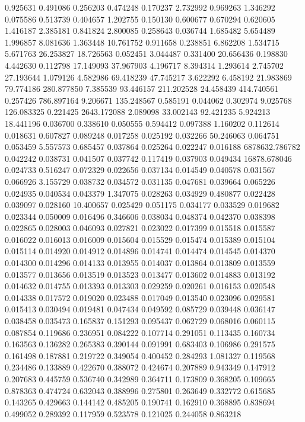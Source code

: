 0.925631
0.491086
0.256203
0.474248
0.170237
2.732992
0.969263
1.346292
0.075586
0.513739
0.404657
1.202755
0.150130
0.600677
0.670294
0.620605
1.416187
2.385181
0.841824
2.800085
0.258643
0.036744
1.685482
5.654489
1.996857
8.081636
1.363448
10.761752
0.911658
0.238851
6.862208
1.534715
5.671763
26.253827
18.726563
0.052451
3.044487
0.331400
20.656436
0.198830
4.442630
0.112798
17.149093
37.967903
4.196717
8.394314
1.293614
2.745702
27.193644
1.079126
4.582986
69.418239
47.745217
3.622292
6.458192
21.983869
79.774186
280.877850
7.385539
93.446157
211.202528
24.458439
414.740561
0.257426
786.897164
9.206671
135.248567
0.585191
0.044062
0.302974
9.025768
126.083325
0.221425
2643.172088
2.089098
33.002143
92.421235
5.924213
18.441196
0.036700
0.338610
0.050555
0.594412
0.097388
1.160202
0.112614
0.018631
0.607827
0.089248
0.017258
0.025192
0.032266
50.246063
0.064751
0.053459
5.557573
0.685457
0.037864
0.025264
0.022247
0.016188
6878632.786782
0.042242
0.038731
0.041507
0.037742
0.117419
0.037903
0.049434
16878.678046
0.024733
0.516247
0.072329
0.022656
0.037134
0.014549
0.040578
0.031567
0.066926
3.155729
0.038732
0.034572
0.031135
0.047681
0.039664
0.065226
0.024935
0.040534
0.043379
1.347075
0.028263
0.034929
0.480877
0.022428
0.039097
0.028160
10.400657
0.025429
0.051175
0.034177
0.033529
0.019682
0.023344
0.050009
0.016496
0.346606
0.038034
0.048374
0.042370
0.038398
0.022865
0.028003
0.046093
0.027821
0.023022
0.017399
0.015518
0.015587
0.016022
0.016013
0.016009
0.015604
0.015529
0.015474
0.015389
0.015104
0.015114
0.014920
0.014912
0.014896
0.014741
0.014474
0.014545
0.014370
0.014300
0.014296
0.014133
0.013955
0.014037
0.013864
0.013809
0.013559
0.013577
0.013656
0.013519
0.013523
0.013477
0.013602
0.014883
0.013192
0.014632
0.014755
0.013393
0.013303
0.029259
0.020261
0.016153
0.020548
0.014338
0.017572
0.019020
0.023488
0.017049
0.013540
0.023096
0.029581
0.015413
0.030494
0.019481
0.047434
0.049592
0.085729
0.039448
0.036147
0.038458
0.035473
0.165837
0.151293
0.095437
0.062729
0.068016
0.060115
0.087854
0.119686
0.236951
0.084222
0.107714
0.291051
0.113435
0.160734
0.163563
0.136282
0.265383
0.390144
0.091991
0.683403
0.106986
0.291575
0.161498
0.187881
0.219722
0.349054
0.400452
0.284293
1.081327
0.119568
0.234486
0.133889
0.422670
0.388072
0.424674
0.207889
0.943349
0.147912
0.207683
0.445759
0.536740
0.342989
0.364711
0.173809
0.368205
0.109665
0.878363
0.474724
0.632043
0.388996
0.275801
0.263649
0.332772
0.615685
0.143265
0.429663
0.144142
0.485205
0.190741
0.162910
0.368895
0.838694
0.499052
0.289392
0.117959
0.523578
0.121025
0.244058
0.863218
